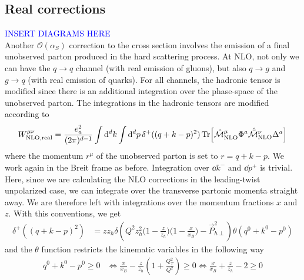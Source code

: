 \subsection{Real corrections}
\textcolor{blue}{INSERT DIAGRAMS HERE}\\
Another $\mathcal{O}(\alpha_S)$ correction to the cross section involves the emission of a final unobserved parton produced in the hard scattering process. At NLO, not only we can have the $q \to q$ channel (with real emission of gluons), but also $q \to g$ and $g \to q$ (with real emission of quarks). For all channels, the hadronic tensor is modified since there is an additional integration over the phase-space of the unobserved parton. The integrations in the hadronic tensors are modified according to
\begin{equation}
\begin{aligned}W^{\mu\nu}_{\rm NLO, real}=\frac{e_a^2}{(2\pi)^{d-1}} \int \dd^dk\int \dd^dp\,\delta^+((q+k-p)^2)\Tr[\hat{\mathcal{M}}^\mu_{\rm NLO}\Phi^a \hat{\bar{\mathcal{M}}}^\nu_{\rm NLO}\Delta^a]
\end{aligned}
\end{equation}
where the momentum $r^\mu$ of the unobserved parton is set to $r=q+k-p$. We work again in the Breit frame as before. Integration over $\dd k^-$ and $\dd p^+$ is trivial. Here, since we are calculating the NLO corrections in the leading-twist unpolarized case, we can integrate over the transverse partonic momenta straight away. We are therefore left with integrations over the momentum fractions $x$ and $z$. With this conventions, we get \cite{koike_transverse_2022} 
\begin{equation}
\begin{aligned}
     \delta^+((q+k-p)^2)&=z z_h\delta\left(Q^2z_h^2\Big(1-\frac{z}{z_h} \Big)\Big(1-\frac{x}{x_B}\Big) - \vec P_{h\perp}^2\right)\theta(q^0+k^0-p^0)
\end{aligned}
\end{equation}
and the $\theta$ function restricts the kinematic variables in the following way
\begin{equation}\label{eq:NLOrealtw2_theta function condition}
    \begin{aligned}
        q^0+k^0-p^0\ge 0 & \iff \frac{x}{x_B}-\frac{z}{z_h}\left(1+\frac{Q_T^2}{Q^2}\right)\ge 0\iff \frac{x}{x_B}+\frac{z}{z_h}-2\ge 0
    \end{aligned}
\end{equation}
